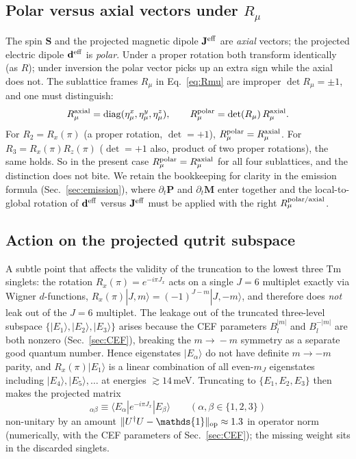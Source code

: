 \documentclass[reprint,amsmath,amssymb,aps,prb,longbibliography]{revtex4-2}
\newcommand{\fix}[1]{#1}
\newcommand{\Jeff}{\mathbf{J}^{\rm eff}}
\newcommand{\deff}{\mathbf{d}^{\rm eff}}
\newcommand{\bfS}{\mathbf{S}}
\newcommand{\bfP}{\mathbf{P}}
\begin{document}
\subsection{Polar versus axial vectors under \texorpdfstring{$R_\mu$}{R\_mu}}
\label{sec:polaraxial}

\fix{The spin $\bfS$ and the projected magnetic dipole $\Jeff$ are
\emph{axial} vectors; the projected electric dipole $\deff$ is
\emph{polar}.} Under a proper rotation both transform identically (as
$R$); under inversion the polar vector picks up an extra sign while the
axial does not. The sublattice frames $R_\mu$ in
Eq.~\eqref{eq:Rmu} are improper $\det R_\mu = \pm 1$, and one must
distinguish:
\begin{equation}
R_\mu^{\rm axial} = \mathrm{diag}(\eta_\mu^{x},\eta_\mu^{y},\eta_\mu^{z}),
\qquad
R_\mu^{\rm polar} = \det(R_\mu)\,R_\mu^{\rm axial}.
\label{eq:RpolarRaxial}
\end{equation}
For $R_2=R_x(\pi)$ (a proper rotation, $\det=+1$), $R_\mu^{\rm polar}=
R_\mu^{\rm axial}$. For $R_3=R_x(\pi)R_z(\pi)$ ($\det=+1$ also, product
of two proper rotations), the same holds. So in the present case
$R_\mu^{\rm polar}=R_\mu^{\rm axial}$ for all four sublattices, and the
distinction does not bite. We retain the bookkeeping for clarity in the
emission formula (Sec.~\ref{sec:emission}), where $\partial_t\bfP$ and
$\partial_t\mathbf{M}$ enter together and the local-to-global rotation
of $\deff$ versus $\Jeff$ must be applied with the right $R_\mu^{\rm
polar/axial}$.

\subsection{Action on the projected qutrit subspace}
\label{sec:Rxnonunitarity}

A subtle point that affects the validity of the truncation to the lowest
three Tm singlets: the rotation $R_x(\pi) = e^{-i\pi J_x}$ acts on a
single $J=6$ multiplet exactly via Wigner $d$-functions, $R_x(\pi)|J,m\rangle
= (-1)^{J-m}|J,-m\rangle$, and therefore does \emph{not} leak out of the
$J=6$ multiplet. \fix{The leakage out of the truncated three-level subspace
$\{|E_1\rangle,|E_2\rangle,|E_3\rangle\}$ arises because the CEF
parameters $B_l^{|m|}$ and $B_l^{-|m|}$ are both nonzero (Sec.~\ref{sec:CEF}),
breaking the $m\!\to\!-m$ symmetry as a separate good quantum number.}
Hence eigenstates $|E_\alpha\rangle$ do not have definite $m\to-m$ parity,
and $R_x(\pi)|E_1\rangle$ is a linear combination of all even-$m_J$
eigenstates including $|E_4\rangle, |E_5\rangle,\ldots$ at energies
$\gtrsim 14$\,meV. Truncating to $\{E_1,E_2,E_3\}$ then makes the projected
matrix
\begin{equation}
[U_{R_x(\pi)}]_{\alpha\beta} \equiv \langle E_\alpha|e^{-i\pi J_x}|E_\beta\rangle
\qquad(\alpha,\beta\in\{1,2,3\})
\label{eq:URxproj}
\end{equation}
non-unitary by an amount $\|U^\dagger U - \mathds{1}\|_{\rm op} \approx 1.3$
in operator norm (numerically, with the CEF parameters of
Sec.~\ref{sec:CEF}); the missing weight sits in the discarded singlets.
\end{document}
